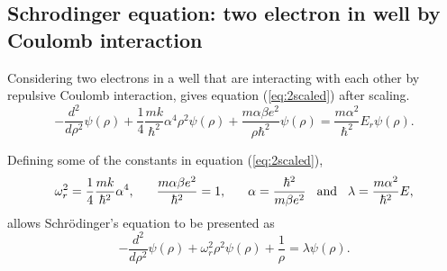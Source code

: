 \documentclass[12pt, a4paper, reqno, article]{amsart}
\begin{document}
\subsection{Schrodinger equation: two electron in well by Coulomb interaction}
Considering two electrons in a well that are interacting with each other by repulsive Coulomb interaction, gives equation (\ref{eq:2scaled}) after scaling.
\begin{equation}
  -\frac{d^2}{d\rho^2} \psi(\rho)
       + \frac{1}{4}\frac{mk}{\hbar^2} \alpha^4\rho^2\psi(\rho)+\frac{m\alpha \beta e^2}{\rho\hbar^2}\psi(\rho)  =
\frac{m\alpha^2}{\hbar^2}E_r \psi(\rho).
\label{eq:2scaled}
\end{equation}

Defining some of the constants in equation (\ref{eq:2scaled}),
\[
\omega_r^2=\frac{1}{4}\frac{mk}{\hbar^2} \alpha^4, \hspace{0.6cm} \frac{m\alpha \beta e^2}{\hbar^2}=1, \hspace{0.6cm} \alpha = \frac{\hbar^2}{m\beta e^2} \hspace{0.3cm} \textrm{and} \hspace{0.3cm} \lambda = \frac{m\alpha^2}{\hbar^2}E,
\]
allows Schrödinger's equation to be presented as
\begin{equation}
  -\frac{d^2}{d\rho^2} \psi(\rho) + \omega_r^2\rho^2\psi(\rho) +\frac{1}{\rho} = \lambda \psi(\rho).
  \label{eq:schrodingerfinal}
\end{equation}
\end{document}
